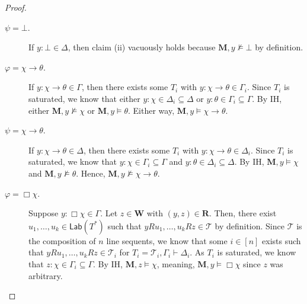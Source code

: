 \documentclass[copyright,creativecommons]{eptcs}
\newcommand{\tel}{\mathcal{T}}
\renewcommand{\phi}{\varphi}
\newcommand{\imp}{\rightarrow}
\newcommand{\lab}{\mathsf{Lab}}
\newcommand{\sar}{\vdash}
\newcommand{\tseq}{T} %
\newcommand{\M}{\mathbf{M}}
\newcommand{\W}{\mathbf{W}}
\newcommand{\R}{\mathbf{R}}
\begin{document}
\begin{proof}
\begin{description}
\item[$\psi = \bot.$] If $y : \bot \in \Delta$, then claim (ii) vacuously holds because $\M, y \not\models \bot$ by definition.

\item[$\phi = \chi \imp \theta.$] If $y : \chi \imp \theta \in \Gamma$, then there exists some $\tseq_{i}$ with $y : \chi \imp \theta \in \Gamma_{i}$. Since $\tseq_{i}$ is saturated, we know that either $y : \chi \in \Delta_{i} \subseteq \Delta$ or $y : \theta \in \Gamma_{i} \subseteq \Gamma$. By IH, either $\M,y \not\models \chi$ or $\M, y \models \theta$. Either way, $\M, y \models \chi \imp \theta$.

\item[$\psi = \chi \imp \theta.$] If $y : \chi \imp \theta \in \Delta$, then there exists some $\tseq_{i}$ with $y : \chi \imp \theta \in \Delta_{i}$. Since $\tseq_{i}$ is saturated, we know that $y : \chi \in \Gamma_{i} \subseteq \Gamma$ and $y : \theta \in \Delta_{i} \subseteq \Delta$. By IH, $\M,y \models \chi$ and $\M, y \not\models \theta$. Hence, $\M, y \not\models \chi \imp \theta$.

\item[$\phi = \Box \chi.$] Suppose $y : \Box \chi \in \Gamma$. Let $z \in \W$ with $(y,z) \in \R$. Then, there exist $u_{1}, \ldots, u_{k} \in \lab(\tseq^{*})$ such that $yRu_{1}, \ldots, u_{k}Rz \in \tel$ by definition. Since $\tel$ is the composition of $n$ line sequents, we know that some $i \in [n]$ exists such that $yRu_{1}, \ldots, u_{k}Rz \in \tel_{i}$ for $\tseq_{i} = \tel_{i}, \Gamma_{i} \sar \Delta_{i}$. As $\tseq_{i}$ is saturated, we know that $z : \chi \in \Gamma_{i} \subseteq \Gamma$. By IH, $\M, z \models \chi$, meaning, $\M, y \models \Box \chi$ since $z$ was arbitrary.


\end{description}
\end{proof}
\end{document}
